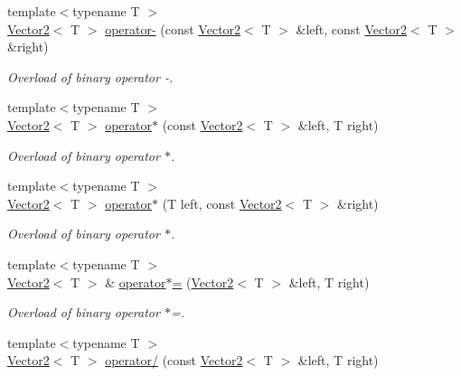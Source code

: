 \begin{DoxyCompactItemize}
{\footnotesize template$<$typename T $>$ }\\\mbox{\hyperlink{classsf_1_1_vector2}{Vector2}}$<$ T $>$ \mbox{\hyperlink{classsf_1_1_vector2_ad027adae53ec547a86c20deeb05c9e85}{operator-\/}} (const \mbox{\hyperlink{classsf_1_1_vector2}{Vector2}}$<$ T $>$ \&left, const \mbox{\hyperlink{classsf_1_1_vector2}{Vector2}}$<$ T $>$ \&right)
\begin{DoxyCompactList}\small\item\em Overload of binary operator -\/. \end{DoxyCompactList}\item 
{\footnotesize template$<$typename T $>$ }\\\mbox{\hyperlink{classsf_1_1_vector2}{Vector2}}$<$ T $>$ \mbox{\hyperlink{classsf_1_1_vector2_a5f48ca928995b41c89f155afe8d16b02}{operator$\ast$}} (const \mbox{\hyperlink{classsf_1_1_vector2}{Vector2}}$<$ T $>$ \&left, T right)
\begin{DoxyCompactList}\small\item\em Overload of binary operator $\ast$. \end{DoxyCompactList}\item 
{\footnotesize template$<$typename T $>$ }\\\mbox{\hyperlink{classsf_1_1_vector2}{Vector2}}$<$ T $>$ \mbox{\hyperlink{classsf_1_1_vector2_ad8b3e1cf7b156a984bc1427539ca8605}{operator$\ast$}} (T left, const \mbox{\hyperlink{classsf_1_1_vector2}{Vector2}}$<$ T $>$ \&right)
\begin{DoxyCompactList}\small\item\em Overload of binary operator $\ast$. \end{DoxyCompactList}\item 
{\footnotesize template$<$typename T $>$ }\\\mbox{\hyperlink{classsf_1_1_vector2}{Vector2}}$<$ T $>$ \& \mbox{\hyperlink{classsf_1_1_vector2_abea24cb28c0d6e2957e259ba4e65d70e}{operator$\ast$=}} (\mbox{\hyperlink{classsf_1_1_vector2}{Vector2}}$<$ T $>$ \&left, T right)
\begin{DoxyCompactList}\small\item\em Overload of binary operator $\ast$=. \end{DoxyCompactList}\item 
{\footnotesize template$<$typename T $>$ }\\\mbox{\hyperlink{classsf_1_1_vector2}{Vector2}}$<$ T $>$ \mbox{\hyperlink{classsf_1_1_vector2_a7409dd89cb3aad6c3bc6622311107311}{operator/}} (const \mbox{\hyperlink{classsf_1_1_vector2}{Vector2}}$<$ T $>$ \&left, T right)

\end{DoxyCompactItemize}
